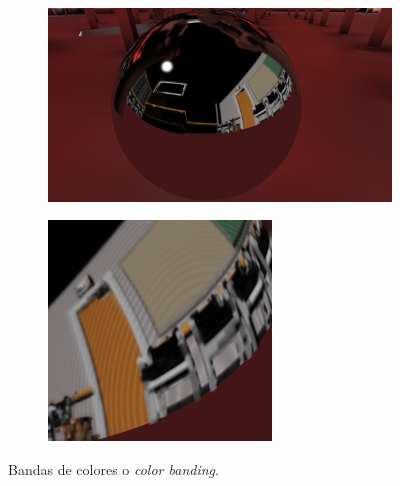 \begin{figure}[H]
	\centering
	\centering
	\begin{subfigure}[b]{0.623\linewidth}
		\centering
		\captionsetup{justification=centering}
		\includegraphics[width=\linewidth]{media/color_banding.png}
	\end{subfigure}%
	\hspace{0.01\textwidth}
	\begin{subfigure}[b]{0.357\linewidth}
		\centering
		\captionsetup{justification=centering}
		\includegraphics[width=\linewidth]{media/color_banding_detail.png}
	\end{subfigure}%
	\caption{Bandas de colores o \emph{color banding}.}
	\label{fig:banding}
\end{figure}


